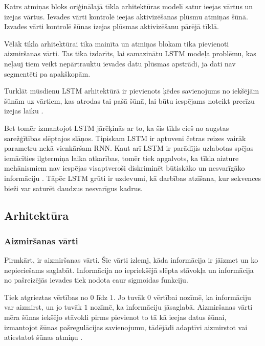 \documentclass[12pt,paper=A4]{report}
\begin{document}
Katrs atmiņas bloks oriģinālajā tīkla arhitektūras modelī satur ieejas vārtus un izejas vārtus. Ievades vārti kontrolē ieejas aktivizēšanas plūsmu atmiņas šūnā. Izvades vārti kontrolē šūnas izejas plūsmas aktivizēšanu pārējā tīklā. 

Vēlāk tīkla arhitektūrai tika mainīta un atmiņas blokam tika pievienoti aizmiršanas vārti. Tas tika izdarīts, lai samazinātu LSTM modeļa problēmu, kas neļauj tiem veikt nepārtrauktu ievades datu plūsmas apstrādi, ja dati nav segmentēti pa apakškopām.

Turklāt mūsdienu LSTM arhitektūrā ir pievienots ķēdes savienojums no iekšējām šūnām uz vārtiem, kas atrodas tai pašā šūnā, lai būtu iespējams noteikt precīzu izejas laiku \cite{ANNTutorial}.

Bet tomēr izmantojot LSTM jārēķinās ar to, ka šis tīkls cieš no augstas sarežģītības slēptajos slāņos. Tipiskam LSTM ir aptuveni četras reizes vairāk parametru nekā vienkāršam RNN. Kaut arī LSTM ir parādījis uzlabotas spējas iemācīties ilgtermiņa laika atkarības, tomēr tiek apgalvots, ka tīkla aizture mehānismiem nav iespējas visaptveroši diskriminēt būtiskāko un nesvarīgāko informāciju \cite{salehinejad2017recent}. Tāpēc LSTM grūti ir uzdevumi, kā darbības atzīšana, kur sekvences bieži var saturēt daudzus nesvarīgus kadrus.



\subsection{Arhitektūra}
\subsubsection{Aizmiršanas vārti}

Pirmkārt, ir aizmiršanas vārti. Šie vārti izlemj, kāda informācija ir jāizmet un ko nepieciešams saglabāt. Informācija no iepriekšējā slēpta stāvokļa un informācija no pašreizējās ievades tiek nodota caur sigmoidas funkciju. 

Tiek atgrieztas vērtības no $0$ līdz $1$. Jo tuvāk $0$ vērtībai nozīmē, ka informāciju var aizmirst, un jo tuvāk $1$ nozīmē, ka informāciju jāsaglabā. Aizmiršanas vārti mēra šūnas iekšējo stāvokli pirms pievienot to tā kā ieejas datus šūnai, izmantojot šūnas pašregulācijas savienojumu, tādējādi adaptīvi aizmirstot vai atiestatot šūnas atmiņu \cite{https://towardsdatascience.com/illustrated-guide-to-lstms-and-gru-s-a-step-by-step-explanation-44e9eb85bf21}.
\end{document}
